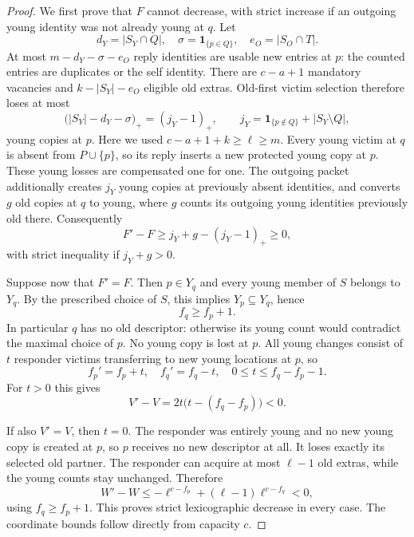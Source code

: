 \documentclass[11pt]{article}
\begin{document}
\begin{proof}
We first prove that $F$ cannot decrease, with strict increase
if an outgoing young identity was not already young at $q$.
Let
\[
 d_Y=|S_Y\cap Q|,\quad \sigma=\mathbf1_{\{p\in Q\}},\quad
 e_O=|S_O\cap T|.
\]
At most $m-d_Y-\sigma-e_O$ reply identities are usable
new entries at $p$: the counted entries are duplicates or
the self identity. There are $c-a+1$ mandatory vacancies
and $k-|S_Y|-e_O$ eligible old extras. Old-first victim
selection therefore loses at most
\[
 \bigl(|S_Y|-d_Y-\sigma\bigr)_+=(j_Y-1)_+,
 \qquad
 j_Y=\mathbf1_{\{p\notin Q\}}+|S_Y\setminus Q|,
\]
young copies at $p$. Here we used
$c-a+1+k\ge\ell\ge m$.
Every young victim at $q$ is absent from $P\cup\{p\}$,
so its reply inserts a new protected young copy at $p$.
These young losses are compensated one for one.
The outgoing packet additionally creates $j_Y$ young copies
at previously absent identities, and converts $g$ old copies
at $q$ to young, where $g$ counts its outgoing young
identities previously old there. Consequently
\[
 F'-F\ge j_Y+g-(j_Y-1)_+\ge0,
\]
with strict inequality if $j_Y+g>0$.

Suppose now that $F'=F$. Then $p\in Y_q$ and every
young member of $S$ belongs to $Y_q$. By the prescribed
choice of $S$, this implies $Y_p\subseteq Y_q$, hence
\[
 f_q\ge f_p+1.
\]
In particular $q$ has no old descriptor: otherwise its
young count would contradict the maximal choice of $p$.
No young copy is lost at $p$. All young changes consist
of $t$ responder victims transferring to new young locations
at $p$, so
\[
 f_p'=f_p+t,\quad f_q'=f_q-t,\quad
 0\le t\le f_q-f_p-1.
\]
For $t>0$ this gives
\[
 V'-V=2t\bigl(t-(f_q-f_p)\bigr)<0.
\]

If also $V'=V$, then $t=0$. The responder was entirely
young and no new young copy is created at $p$, so $p$
receives no new descriptor at all. It loses exactly its
selected old partner. The responder can acquire at most
$\ell-1$ old extras, while the young counts stay unchanged.
Therefore
\[
 W'-W\le-\ell^{c-f_p}
       +(\ell-1)\ell^{c-f_q}<0,
\]
using $f_q\ge f_p+1$.
This proves strict lexicographic decrease in every case.
The coordinate bounds follow directly from capacity $c$.
\end{proof}
\end{document}
